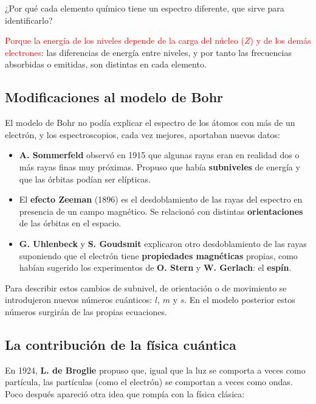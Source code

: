 \begin{exercise}
    ¿Por qué cada elemento químico tiene un espectro diferente, que sirve para identificarlo?
    \begin{solu}
        \textcolor{red}{Porque la energía de los niveles depende de la carga del núcleo (\(Z\)) y de los demás electrones}: las
        diferencias de energía entre niveles, y por tanto las frecuencias absorbidas o emitidas, son distintas en cada elemento.
    \end{solu}
\end{exercise}

\subsection{Modificaciones al modelo de Bohr}

El modelo de Bohr no podía explicar el espectro de los átomos con más de un electrón, y los espectroscopios, cada vez mejores,
aportaban nuevos datos:
\begin{itemize}
    \item \textbf{A. Sommerfeld} observó en 1915 que algunas rayas eran en realidad dos o más rayas finas muy próximas. Propuso
    que había \textbf{subniveles} de energía y que las órbitas podían ser elípticas.
    \item El \textbf{efecto Zeeman} (1896) es el desdoblamiento de las rayas del espectro en presencia de un campo magnético. Se
    relacionó con distintas \textbf{orientaciones} de las órbitas en el espacio.
    \item \textbf{G. Uhlenbeck} y \textbf{S. Goudsmit} explicaron otro desdoblamiento de las rayas suponiendo que el electrón
    tiene \textbf{propiedades magnéticas} propias, como habían sugerido los experimentos de \textbf{O. Stern} y
    \textbf{W. Gerlach}: el \textbf{espín}.
\end{itemize}
Para describir estos cambios de subnivel, de orientación o de movimiento se introdujeron nuevos números cuánticos: \(l\),
\(m\) y \(s\). En el modelo posterior estos números surgirán de las propias ecuaciones.

\subsection{La contribución de la física cuántica}

En 1924, \textbf{L. de Broglie} propuso que, igual que la luz se comporta a veces como partícula, las partículas (como el
electrón) se comportan a veces como ondas. Poco después apareció otra idea que rompía con la física clásica:


